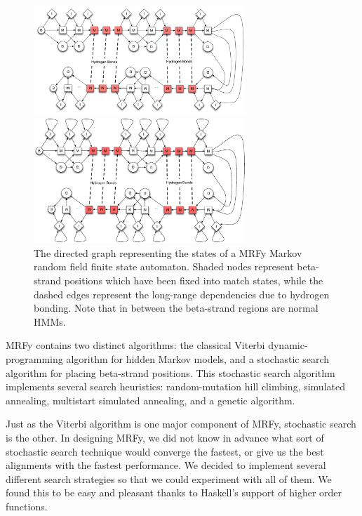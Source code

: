 \documentclass[preprint,nonatbib,blockstyle,nocopyrightspace,times]{sigplanconf}
\begin{document}
\begin{figure}[h!] 
\ifpdfmadness
\centerline{\includegraphics[width=8cm]{mrf_interleave_diagram.pdf}} 
\else
\centerline{\includegraphics[width=8cm]{mrf_interleave_diagram.eps}} 
\fi
\caption{The directed graph representing the states of a MRFy Markov random 
field finite state automaton.
Shaded nodes represent beta-strand positions which have been fixed into match states, 
while the dashed edges represent the long-range dependencies due to hydrogen 
bonding.
Note that in between the beta-strand regions are normal HMMs.}\label{mrf} \end{figure}


MRFy contains two distinct algorithms: the classical Viterbi 
dynamic-programming algorithm for hidden Markov models, and a stochastic search 
algorithm for placing beta-strand positions.
This stochastic search algorithm 
implements several search heuristics: random-mutation hill climbing, simulated 
annealing, multistart simulated annealing, and a genetic algorithm.


Just as the Viterbi algorithm is one major component of MRFy, stochastic search 
is the other.
In designing MRFy, we did not know in advance what sort of 
stochastic search technique would converge the fastest, or give us the best 
alignments with the fastest performance.
We decided to implement several 
different search strategies so that we could experiment with all of them.
We 
found this to be easy and pleasant thanks to Haskell's support of higher order 
functions.
\end{document}
